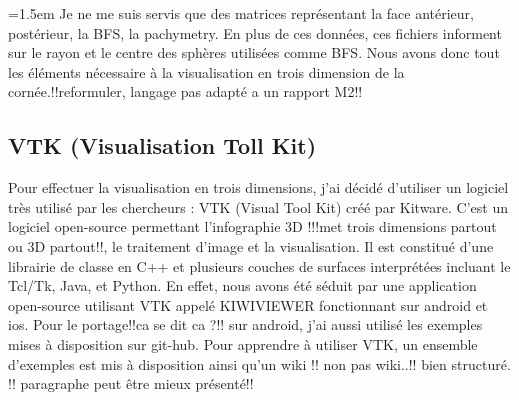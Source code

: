\documentclass[a4paper,12pt]{article}
\begin{document}
\vspace{0.25cm}
\parindent=1.5em
Je ne me suis servis que des matrices représentant la face antérieur, postérieur, la BFS, la pachymetry. En plus de ces données, ces fichiers informent sur le rayon et le centre des sphères utilisées comme BFS. Nous avons donc tout les éléments nécessaire à la visualisation en trois dimension de la cornée.!!reformuler, langage pas adapté a un rapport M2!!
	\subsection{VTK (Visualisation Toll Kit)}
Pour effectuer la visualisation en trois dimensions, j'ai décidé d'utiliser un logiciel très utilisé par les chercheurs : VTK (Visual Tool Kit) créé par Kitware. C'est un logiciel open-source permettant l'infographie 3D !!!met trois dimensions partout ou 3D partout!!, le traitement d'image et la visualisation.  Il est constitué d'une librairie de classe en C++ et plusieurs couches de surfaces interprétées incluant le Tcl/Tk, Java, et Python. En effet, nous avons été séduit par une application open-source utilisant VTK appelé KIWIVIEWER fonctionnant sur android et ios. Pour le portage!!ca se dit ca ?!! sur android, j'ai aussi utilisé les exemples mises à disposition sur git-hub. Pour apprendre à utiliser VTK, un ensemble d'exemples est mis à disposition ainsi qu'un wiki !! non pas wiki..!! bien structuré. !! paragraphe peut être mieux présenté!!
\end{document}
